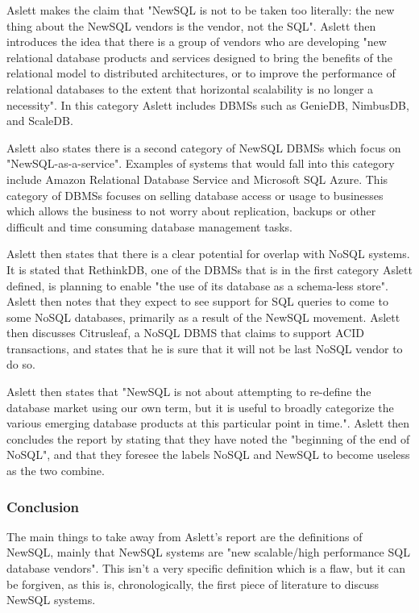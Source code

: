 \documentclass[10pt, conference]{IEEEtran}
\begin{document}
Aslett makes the claim that "NewSQL is not to be taken too literally: the new thing about the NewSQL vendors is the vendor, not the SQL". Aslett then introduces the idea that there is a group of vendors who are developing "new relational database products and services designed to bring the benefits of the relational model to distributed architectures, or to improve the performance of relational databases to the extent that horizontal scalability is no longer a necessity". In this category Aslett includes DBMSs such as GenieDB, NimbusDB, and ScaleDB.

Aslett also states there is a second category of NewSQL DBMSs which focus on "NewSQL-as-a-service". Examples of systems that would fall into this category include Amazon Relational Database Service and Microsoft SQL Azure. This category of DBMSs focuses on selling database access or usage to businesses which allows the business to not worry about replication, backups or other difficult and time consuming database management tasks.

Aslett then states that there is a clear potential for overlap with NoSQL systems. It is stated that RethinkDB, one of the DBMSs that is in the first category Aslett defined, is planning to enable "the use of its database as a schema-less store". Aslett then notes that they expect to see support for SQL queries to come to some NoSQL databases, primarily as a result of the NewSQL movement. Aslett then discusses Citrusleaf, a NoSQL DBMS that claims to support ACID transactions, and states that he is sure that it will not be last NoSQL vendor to do so.

Aslett then states that "NewSQL is not about attempting to re-define the database market using our own term, but it is useful to broadly categorize the various emerging database products at this particular point in time.". Aslett then concludes the report by stating that they have noted the "beginning of the end of NoSQL", and that they foresee the labels NoSQL and NewSQL to become useless as the two combine.

\subsubsection{Conclusion}
The main things to take away from Aslett's report are the definitions of NewSQL, mainly that NewSQL systems are "new scalable/high performance SQL database vendors". This isn't a very specific definition which is a flaw, but it can be forgiven, as this is, chronologically, the first piece of literature to discuss NewSQL systems.
\end{document}
